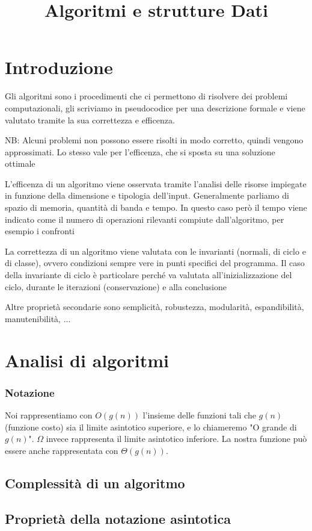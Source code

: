 \documentclass[12pt, a4paper]{article}
\title{Algoritmi e strutture Dati}
\begin{document}
    

\section{Introduzione}
Gli algoritmi sono i procedimenti che ci permettono di risolvere dei problemi computazionali, gli scriviamo in 
pseudocodice per una descrizione formale e viene valutato tramite la sua correttezza e efficenza. 

NB: Alcuni problemi non possono essere risolti in modo corretto, quindi vengono approssimati. Lo stesso vale per
l'efficenza, che si sposta su una soluzione ottimale

L'efficenza di un algoritmo viene osservata tramite l'analisi delle risorse impiegate in funzione della dimensione
e tipologia dell'input. Generalmente parliamo di spazio di memoria, quantità di banda e tempo. In questo caso
però il tempo viene indicato come il numero di operazioni rilevanti compiute dall'algoritmo, per esempio i
confronti

La correttezza di un algoritmo viene valutata con le invarianti (normali, di ciclo e di classe), ovvero condizioni
sempre vere in punti specifici del programma. Il caso della invariante di ciclo è particolare perché va valutata
all'inizializzazione del ciclo, durante le iterazioni (conservazione) e alla conclusione

Altre proprietà secondarie sono semplicità, robustezza, modularità, espandibilità, manutenibilità, ...

\newpage
\section{Analisi di algoritmi}
\subsubsection*{Notazione}
Noi rappresentiamo con $O(g(n))$ l'insieme delle funzioni tali che $g(n)$ (funzione costo) sia il limite asintotico
superiore, e lo chiameremo "O grande di $g(n)$". $\Omega$ invece rappresenta il limite asintotico inferiore.
La nostra funzione può essere anche rappresentata con $\Theta(g(n))$.

\subsection{Complessità di un algoritmo}

\subsection{Proprietà della notazione asintotica}
\end{document}

